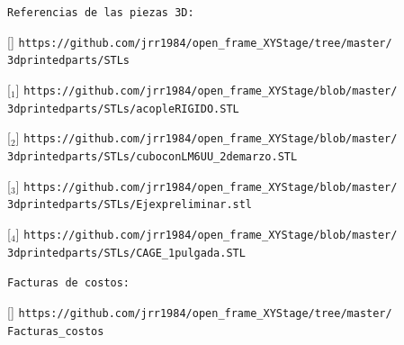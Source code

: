\texttt{Referencias de las piezas 3D:}

[\href{https://github.com/jrr1984/open\_frame\_XYStage/tree/master/3dprintedparts/STLs}{\faCubes}] \texttt{https://github.com/jrr1984/open\_frame\_XYStage/tree/master/\\\hspace{1.5cm}3dprintedparts/STLs}

[\href{https://github.com/jrr1984/open\_frame\_XYStage/blob/master/3dprintedparts/STLs/acopleRIGIDO.STL}{\faCubes$_{1}$}] \texttt{https://github.com/jrr1984/open\_frame\_XYStage/blob/master/\\\hspace{1.5cm}3dprintedparts/STLs/acopleRIGIDO.STL}

[\href{https://github.com/jrr1984/open\_frame\_XYStage/blob/master/3dprintedparts/STLs/cuboconLM6UU\_2demarzo.STL}{\faCubes$_{2}$}] \texttt{https://github.com/jrr1984/open\_frame\_XYStage/blob/master/\\\hspace{1.5cm}3dprintedparts/STLs/cuboconLM6UU\_2demarzo.STL}

[\href{https://github.com/jrr1984/open\_frame\_XYStage/blob/master/3dprintedparts/STLs/Ejexpreliminar.stl}{\faCubes$_{3}$}] \texttt{https://github.com/jrr1984/open\_frame\_XYStage/blob/master/\\\hspace{1.5cm}3dprintedparts/STLs/Ejexpreliminar.stl}

[\href{https://github.com/jrr1984/open\_frame\_XYStage/blob/master/3dprintedparts/STLs/CAGE\_1pulgada.STL}{\faCubes$_{4}$}] \texttt{https://github.com/jrr1984/open\_frame\_XYStage/blob/master/\\\hspace{1.5cm}3dprintedparts/STLs/CAGE\_1pulgada.STL}

\texttt{Facturas de costos:}

[\href{https://github.com/jrr1984/open\_frame\_XYStage/tree/master/Facturas\_costos}{\faMoneyCheck}] \texttt{https://github.com/jrr1984/open\_frame\_XYStage/tree/master/\\\hspace{1.5cm}Facturas\_costos}







